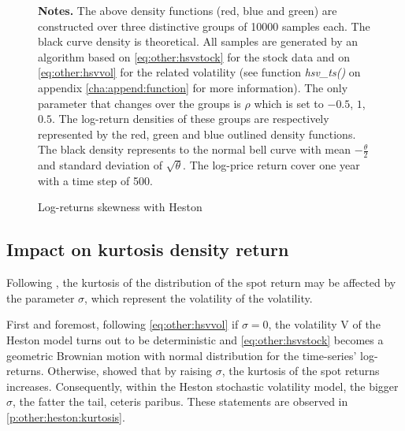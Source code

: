 \documentclass[12pt,a4paper]{report}
\begin{document}
\begin{figure}[ht]
\centering

\caption{Log-returns skewness with Heston}
  \begin{changemargin}{0.5cm}{0.5cm}
  \medskip
\footnotesize
{}\textbf{Notes.} The above density functions (red, blue and green) are constructed over three distinctive groups of 10000 samples each. The black curve density is theoretical.
All samples are generated by an algorithm based on \cref{eq:other:hsvstock} for the stock data and on \cref{eq:other:hsvvol} for the related volatility (see function \textit{hsv\_ts()} on appendix \ref{cha:append:function} for more information).
The only parameter that changes over the groups is $\rho$ which is set to $-0.5$, $1$, $0.5$. The log-return densities of these groups are respectively represented by the red, green and blue outlined density functions. 
The black density represents to the normal bell curve with mean $- \frac{\theta}{2}$ and standard deviation of $\sqrt{\theta}$. The log-price return cover one year with a time step of 500.  
\end{changemargin}
\label{p:other:heston:skewness}
\end{figure}

\subsection{Impact on kurtosis density return}
\label{sub:hestonkurtosis}

Following \citet{heston1993}, the kurtosis of the distribution of the spot return may be affected by the parameter $\sigma$, which represent the volatility of the volatility.

First and foremost, following \cref{eq:other:hsvvol} if $\sigma = 0$, the volatility V of the Heston model turns out to be deterministic and \cref{eq:other:hsvstock}  becomes a geometric Brownian motion with normal distribution for the time-series' log-returns.
Otherwise, \citet{heston1993} showed that by raising $\sigma$, the kurtosis of the spot returns increases. Consequently, within the Heston stochastic volatility model, the bigger $\sigma$, the fatter the tail, ceteris paribus. These statements are observed in \cref{p:other:heston:kurtosis}.
\end{document}
